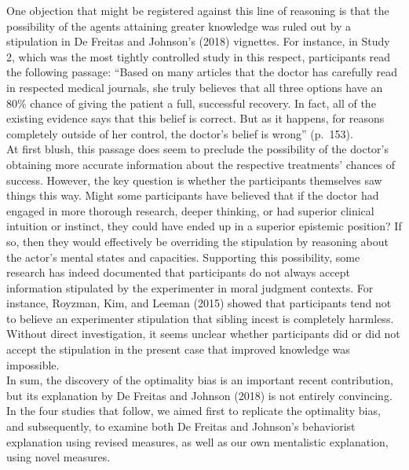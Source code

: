 \documentclass[
  man,floatsintext]{apa6}
\begin{document}
One objection that might be registered against this line of reasoning is that the possibility of the agents attaining greater knowledge was ruled out by a stipulation in De Freitas and Johnson's (2018) vignettes. For instance, in Study 2, which was the most tightly controlled study in this respect, participants read the following passage:
``Based on many articles that the doctor has carefully read in respected medical journals, she truly believes that all three options have an 80\% chance of giving the patient a full, successful recovery. In fact, all of the existing evidence says that this belief is correct. But as it happens, for reasons completely outside of her control, the doctor's belief is wrong'' (p.~153).\\
At first blush, this passage does seem to preclude the possibility of the doctor's obtaining more accurate information about the respective treatments' chances of success. However, the key question is whether the participants themselves saw things this way. Might some participants have believed that if the doctor had engaged in more thorough research, deeper thinking, or had superior clinical intuition or instinct, they could have ended up in a superior epistemic position? If so, then they would effectively be overriding the stipulation by reasoning about the actor's mental states and capacities. Supporting this possibility, some research has indeed documented that participants do not always accept information stipulated by the experimenter in moral judgment contexts. For instance, Royzman, Kim, and Leeman (2015) showed that participants tend not to believe an experimenter stipulation that sibling incest is completely harmless. Without direct investigation, it seems unclear whether participants did or did not accept the stipulation in the present case that improved knowledge was impossible.\\
In sum, the discovery of the optimality bias is an important recent contribution, but its explanation by De Freitas and Johnson (2018) is not entirely convincing. In the four studies that follow, we aimed first to replicate the optimality bias, and subsequently, to examine both De Freitas and Johnson's behaviorist explanation using revised measures, as well as our own mentalistic explanation, using novel measures.\\
\end{document}
